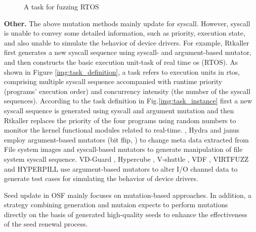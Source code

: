 \begin{figure*}[!t]
        \centering
        \hspace{20pt}\vline\hspace{20pt}
        \caption{A task for fuzzing RTOS}
\end{figure*}

\textbf{Other.}
The above mutation methods mainly update for syscall. However, syscall is unable to convey some detailed information, such as priority, execution state, and also unable to simulate the behavior of device drivers. For example, Rtkaller \cite{shen2021rtkaller} first generates a new syscall sequence using syscall- and argument-based mutator, and then constructs the basic execution unit-task of real time os (RTOS). As shown in Figure \ref{img:task_definition}, a task refers to execution units in rtos, comprising multiple syscall sequence accompanied with runtime priority (programs' execution order) and concurrency intensity (the number of the syscall sequences). According to the task definition in Fig.\ref{img:task_instance} first a new syscall sequence is generated using syscall and argument mutation and then Rtkaller replaces the priority of the four programs using random numbers to monitor the kernel functional modules related to real-time. , Hydra \cite{Hydra2020finding} and janus \cite{JANUS2019fuzzing} employ argument-based mutators (\eg bit flip, \etc) to change meta data extracted from File system images and syscall-based mutators to generate manipulation of file system syscall sequence. VD-Guard \cite{Liu2023VDGuard}, Hypercube \cite{schumilo2020hyper}, V-shuttle \cite{pan2021V-shuttle}, VDF \cite{henderson2017vdf}, VIRTFUZZ \cite{Huster2024ToBoldly} and HYPERPILL \cite{Bulekov2024HYPERPILLFF} use argument-based mutators to alter I/O channel data to generate test cases for simulating the behavior of device drivers.

Seed update in OSF mainly focuses on mutation-based approaches. In addition, a strategy combining generation and mutaion expects to perform mutations directly on the basis of generated high-quality seeds to enhance the effectiveness of the seed renewal process.


